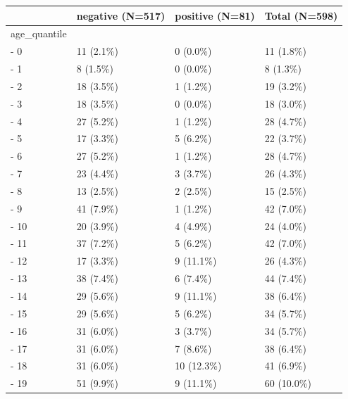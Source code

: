\documentclass[
]{article}
\begin{document}
\begin{longtable}[]{@{}llll@{}}
\toprule()
& negative (N=517) & positive (N=81) & Total (N=598) \\
\midrule()
\endhead
age\_quantile & & & \\
- 0 & 11 (2.1\%) & 0 (0.0\%) & 11 (1.8\%) \\
- 1 & 8 (1.5\%) & 0 (0.0\%) & 8 (1.3\%) \\
- 2 & 18 (3.5\%) & 1 (1.2\%) & 19 (3.2\%) \\
- 3 & 18 (3.5\%) & 0 (0.0\%) & 18 (3.0\%) \\
- 4 & 27 (5.2\%) & 1 (1.2\%) & 28 (4.7\%) \\
- 5 & 17 (3.3\%) & 5 (6.2\%) & 22 (3.7\%) \\
- 6 & 27 (5.2\%) & 1 (1.2\%) & 28 (4.7\%) \\
- 7 & 23 (4.4\%) & 3 (3.7\%) & 26 (4.3\%) \\
- 8 & 13 (2.5\%) & 2 (2.5\%) & 15 (2.5\%) \\
- 9 & 41 (7.9\%) & 1 (1.2\%) & 42 (7.0\%) \\
- 10 & 20 (3.9\%) & 4 (4.9\%) & 24 (4.0\%) \\
- 11 & 37 (7.2\%) & 5 (6.2\%) & 42 (7.0\%) \\
- 12 & 17 (3.3\%) & 9 (11.1\%) & 26 (4.3\%) \\
- 13 & 38 (7.4\%) & 6 (7.4\%) & 44 (7.4\%) \\
- 14 & 29 (5.6\%) & 9 (11.1\%) & 38 (6.4\%) \\
- 15 & 29 (5.6\%) & 5 (6.2\%) & 34 (5.7\%) \\
- 16 & 31 (6.0\%) & 3 (3.7\%) & 34 (5.7\%) \\
- 17 & 31 (6.0\%) & 7 (8.6\%) & 38 (6.4\%) \\
- 18 & 31 (6.0\%) & 10 (12.3\%) & 41 (6.9\%) \\
- 19 & 51 (9.9\%) & 9 (11.1\%) & 60 (10.0\%) \\
\bottomrule()
\end{longtable}
\end{document}
